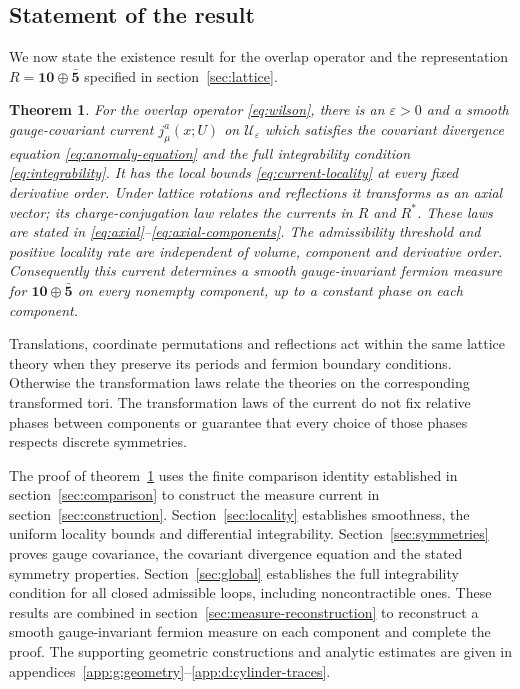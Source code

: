 \documentclass[11pt,a4paper]{article}
\newtheorem{theorem}{Theorem}[section]
\theoremstyle{remark}
\newcommand{\eps}{\varepsilon}
\begin{document}
\subsection{Statement of the result}

We now state the existence result for the overlap operator
and the representation \(R=\mathbf{10}\oplus\bar{\mathbf5}\)
specified in section~\ref{sec:lattice}.

\begin{theorem}
\label{thm:measure}
For the overlap operator \eqref{eq:wilson}, there is
an \(\eps>0\) and a smooth gauge-covariant current
\(j_\mu^a(x;U)\) on \(\mathcal U_\eps\) which satisfies
the covariant divergence equation \eqref{eq:anomaly-equation}
and the full integrability condition \eqref{eq:integrability}.
It has the local bounds \eqref{eq:current-locality} at every fixed
derivative order. Under lattice rotations and reflections it
transforms as an axial vector; its charge-conjugation law
relates the currents in \(R\) and \(R^*\).
These laws are stated in
\eqref{eq:axial}--\eqref{eq:axial-components}.
The admissibility threshold and positive locality rate
are independent of volume, component and derivative order.
Consequently this current determines a smooth gauge-invariant
fermion measure for \(\mathbf{10}\oplus\bar{\mathbf5}\) on
every nonempty component, up to a constant phase on each
component.
\end{theorem}

Translations, coordinate permutations and reflections act
within the same lattice theory when they preserve its periods
and fermion boundary conditions. Otherwise the transformation
laws relate the theories on the corresponding transformed tori.
The transformation laws of the current do not fix relative
phases between components or guarantee that every choice
of those phases respects discrete symmetries.

The proof of theorem~\ref{thm:measure} uses the finite
comparison identity established in section~\ref{sec:comparison}
to construct the measure current in section~\ref{sec:construction}.
Section~\ref{sec:locality} establishes smoothness, the uniform
locality bounds and differential integrability.
Section~\ref{sec:symmetries} proves gauge covariance, the
covariant divergence equation and the stated symmetry properties.
Section~\ref{sec:global} establishes the full integrability
condition for all closed admissible loops, including
noncontractible ones. These results are combined in
section~\ref{sec:measure-reconstruction} to reconstruct a
smooth gauge-invariant fermion measure on each component
and complete the proof. The supporting geometric constructions
and analytic estimates are given in
appendices~\ref{app:g:geometry}--\ref{app:d:cylinder-traces}.
\end{document}
